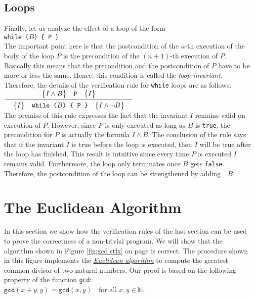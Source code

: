\subsection{Loops}
Finally, let us analyze the effect of a loop of the form
\\[0.2cm]
\hspace*{1.3cm}
\texttt{while ($B$) \{ P \}} 
\\[0.2cm]
The important point here is that the postcondition of the $n$-th
execution of the body of the loop $P$ is the precondition of the $(n\!+\!1)$-th
execution of $P$.  Basically this means that the precondition and the
postcondition of $P$ have to be more or less the same.
Hence, this condition is called the \emph{loop invariant}.  Therefore,
the details of the verification rule for \texttt{while} loops are as follows:
\\[0.2cm]
\hspace*{1.3cm}
$\bruch{\hoare{I \wedge B}{P}{I}}{\quad \hoare{I}{while ($B$) \{ P \}}{I \wedge \neg B}\quad}$
\\[0.2cm]
The premiss of this rule expresses the fact that the invariant $I$ remains valid on execution of $P$.
However, since $P$ is only executed as long as $B$ is \texttt{true}, the precondition for $P$ is actually 
the formula $I \wedge B$.  The conclusion of the rule says that if the invariant $I$ is true before
the loop is executed, then $I$ will be true after the loop has finished.  This result is intuitive
since every time $P$ is executed $I$ remains valid.  Furthermore, the loop only terminates once $B$
gets \texttt{false}.  Therefore, the postcondition of the loop can be strengthened by adding $\neg B$.



\section{The Euclidean  Algorithm}
In this section we show how the verification rules of the last section can be used to prove the
correctness of a non-trivial program.
We will show that the algorithm shown in Figure \ref{fig:gcd.stlx} on page \pageref{fig:gcd.stlx} is correct.
The procedure shown in this figure implements the
\href{http://en.wikipedia.org/wiki/Euclidean_algorithm}{\emph{Euclidean algorithm}}
to compute the greatest common divisor of two natural numbers.  Our proof is based on the following
property of the function \texttt{gcd}:
\\[0.2cm]
\hspace*{1.3cm}
$\texttt{gcd}(x + y, y) = \texttt{gcd}(x,y) \quad \mbox{for all $x, y \in \mathbb{N}$}$.


